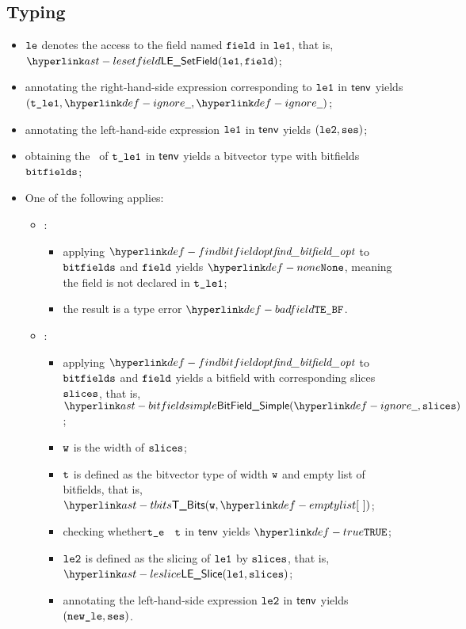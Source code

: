 \subsection{Typing}
\ProseParagraph
\AllApply
\begin{itemize}
  \item $\texttt{le}$ denotes the access to the field named $\texttt{field}$ in $\texttt{le1}$, that is, \\ $\LESetField(\vleone, \field)$;
  \item annotating the right-hand-side expression corresponding to $\texttt{le1}$ in $\textsf{tenv}$ yields \\ $(\vtleone, \Ignore, \Ignore)$\ProseOrTypeError;
  \item annotating the left-hand-side expression $\texttt{le1}$ in $\textsf{tenv}$ yields $(\texttt{le2}, \texttt{ses})$\ProseOrTypeError;
  \item obtaining the \underlyingtype\ of $\texttt{t\_le1}$ in $\textsf{tenv}$ yields a bitvector type with bitfields $\texttt{bitfields}$\ProseOrTypeError;
  \item One of the following applies:
  \begin{itemize}
    \item {}:
    \begin{itemize}
      \item applying $\findbitfieldopt$ to $\texttt{bitfields}$ and $\texttt{field}$ yields $\None$, meaning the field is not declared
            in $\texttt{t\_le1}$;
      \item the result is a type error $\BadField$.
    \end{itemize}

    \item {}:
    \begin{itemize}
      \item applying $\findbitfieldopt$ to $\texttt{bitfields}$ and $\texttt{field}$ yields a bitfield with corresponding slices $\texttt{slices}$,
            that is, $\BitFieldSimple(\Ignore, \slices)$;
      \item $\texttt{w}$ is the width of $\texttt{slices}$;
      \item $\texttt{t}$ is defined as the bitvector type of width $\texttt{w}$ and empty list of bitfields, that is, $\TBits(\vw, \emptylist)$;
      \item checking whether$\texttt{t\_e}$ \typesatisfies\ $\texttt{t}$ in $\textsf{tenv}$ yields $\True$\ProseOrTypeError;
      \item $\texttt{le2}$ is defined as the slicing of $\texttt{le1}$ by $\texttt{slices}$, that is, \\ $\LESlice(\vleone, \slices)$;
      \item annotating the left-hand-side expression $\texttt{le2}$ in $\textsf{tenv}$ yields \\ $(\texttt{new\_le}, \texttt{ses})$\ProseOrTypeError.
    \end{itemize}


\end{itemize}
\end{itemize}
